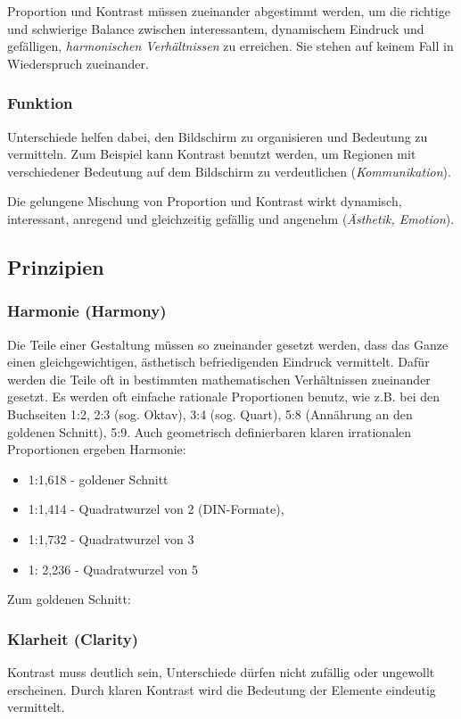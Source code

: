 Proportion und Kontrast müssen zueinander abgestimmt werden, um die  richtige und schwierige Balance zwischen interessantem, dynamischem Eindruck und gefälligen, \emph{harmonischen Verhältnissen} zu erreichen. Sie stehen auf keinem Fall in Wiederspruch zueinander.

\subsubsection*{Funktion}
Unterschiede helfen dabei, den Bildschirm zu organisieren und Bedeutung zu vermitteln. Zum Beispiel kann Kontrast benutzt werden, um Regionen mit verschiedener Bedeutung auf dem Bildschirm zu verdeutlichen (\emph{Kommunikation}).

Die gelungene Mischung von Proportion und Kontrast wirkt dynamisch, interessant, anregend und gleichzeitig gefällig und angenehm (\emph{Ästhetik, Emotion}). 


\subsection{Prinzipien}
\subsubsection*{Harmonie (Harmony)}
Die Teile einer Gestaltung müssen so zueinander gesetzt werden, dass das Ganze einen gleichgewichtigen, ästhetisch befriedigenden Eindruck vermittelt. Dafür werden die Teile oft in bestimmten mathematischen Verhältnissen zueinander gesetzt. Es werden oft einfache rationale Proportionen benutz, wie z.B. bei den Buchseiten 1:2, 2:3 (sog. Oktav), 3:4 (sog. Quart), 5:8 (Annährung an den goldenen Schnitt), 5:9. Auch geometrisch definierbaren klaren irrationalen Proportionen ergeben Harmonie:
\begin{itemize}
\item 1:1,618 - goldener Schnitt
\item 1:1,414 - Quadratwurzel von 2 (DIN-Formate), 
\item 1:1,732 - Quadratwurzel von 3
\item 1: 2,236 - Quadratwurzel von 5
\end{itemize}
Zum goldenen Schnitt:
\subsubsection*{Klarheit (Clarity)}
Kontrast muss deutlich sein, Unterschiede dürfen nicht zufällig oder ungewollt erscheinen. Durch klaren Kontrast wird die Bedeutung der Elemente eindeutig vermittelt. 
 
